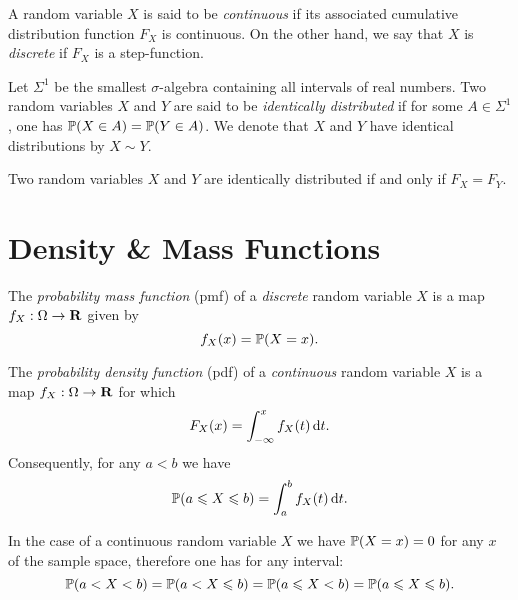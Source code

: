 \begin{definition}
\label{def:continuity-discreteness-random-variable}
A random variable \(X\) is said to be \emph{continuous} if its associated
cumulative distribution function \(F_X\) is continuous. On the other hand, we
say that \(X\) is \emph{discrete} if \(F_X\) is a step-function.
\end{definition}

\begin{definition}
\label{def:identically-distributed-random-variables}
Let \(\Sigma^1\) be the smallest \(\sigma\)-algebra containing all intervals of
real numbers. Two random variables \(X\) and \(Y\) are said to be
\emph{identically distributed} if for some \(A \in \Sigma^1\), one has
\(\operatorname{\mathbb{P}}(X \in A) = \operatorname{\mathbb{P}}(Y \in A)\). We denote that \(X\) and \(Y\) have
identical distributions by \(X \sim Y\).
\end{definition}

\begin{theorem}
\label{thm:random-variables-identical-iff-equal-cdfs}
Two random variables \(X\) and \(Y\) are identically distributed if and only if
\(F_X = F_Y\).
\end{theorem}

\section{Density \& Mass Functions}

\begin{definition}
\label{def:probability-mass-function}
The \emph{probability mass function} (pmf) of a \emph{discrete} random variable
\(X\) is a map \(f_X: \Omega \to \mathbf{R}\) given by
\[
f_X(x) = \operatorname{\mathbb{P}}(X = x).
\]
\end{definition}

\begin{definition}
\label{def:probability-mass-function}
The \emph{probability density function} (pdf) of a \emph{continuous} random variable
\(X\) is a map \(f_X: \Omega \to \mathbf{R}\) for which
\[
F_X(x) = \int_{-\infty}^x f_X(t)\, \mathrm{d} t.
\]
Consequently, for any \(a < b\) we have
\[
\operatorname{\mathbb{P}}(a \leqslant X \leqslant b) = \int_a^b f_X(t)\, \mathrm{d} t.
\]
\end{definition}

\begin{remark}
\label{rem:interval-probability-continuous-random-variable}
In the case of a continuous random variable \(X\) we have \(\operatorname{\mathbb{P}}(X = x) = 0\)
for any \(x\) of the sample space, therefore one has for any interval:
\[
\operatorname{\mathbb{P}}(a < X < b)
= \operatorname{\mathbb{P}}(a < X \leqslant b)
= \operatorname{\mathbb{P}}(a \leqslant X < b)
= \operatorname{\mathbb{P}}(a \leqslant X \leqslant b).
\]
\end{remark}

